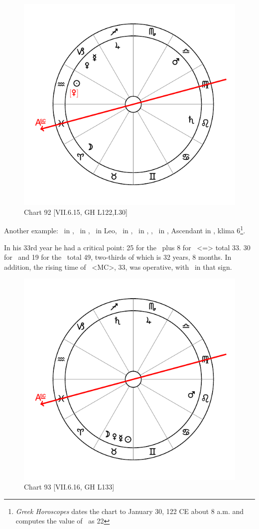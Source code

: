 \newpage
\begin{figure}
\centering
\vspace{0pt}
\includegraphics[width=.68\textwidth]{charts/7_6_15}
\caption{Chart 92 [VII.6.15, GH L122,I.30] }
\label{fig:chart92}
\end{figure} 

Another example: \Sun\, in \Aquarius, \Moon\, in \Aries, \Saturn\, in Leo, \Jupiter\, in \Sagittarius, \Mars\, in \Libra, \Venus, \Mercury\, in \Capricorn, Ascendant in \Pisces, klima 6\footnote{\textit{Greek Horoscopes} dates the chart to January 30, 122 CE about 8 a.m. and computes the value of \Venus\, as 22 \Aquarius}.

In his 33rd year he had a critical point: 25 for the \Moon\, plus 8 for \Libra\, <=\Venus> total 33. 30 for \Saturn\, and 19 for the \Sun\, total 49, two-thirds of which is 32 years, 8 months. In addition, the rising time of \Sagittarius\, <MC>, 33, was operative, with \Jupiter\, in that sign.

\newpage
\begin{figure}
\centering
\vspace{0pt}
\includegraphics[width=.68\textwidth]{charts/7_6_16}
\caption{Chart 93 [VII.6.16, GH L133] }
\label{fig:chart93}
\end{figure} 

